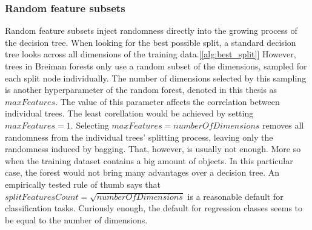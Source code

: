 \documentclass[11pt]{article}
\begin{document}
      \subsubsection{Random feature subsets}
        Random feature subsets inject randomness directly into the growing process of the decision tree. When looking for the best possible split, a standard decision tree looks across all dimensions of the training data.[\ref{alg:best_split}] However, trees in Breiman forests only use a random subset of the dimensions, sampled for each split node individually. The number of dimensions selected by this sampling is another hyperparameter of the random forest, denoted in this thesis as $maxFeatures$. The value of this parameter affects the correlation between individual trees.\cite{brabec} The least corellation would be achieved by setting $maxFeatures = 1$. Selecting $maxFeatures = numberOfDimensions$ removes all randomness from the individual trees' splitting process, leaving only the randomness induced by bagging. That, however, is usually not enough. More so when the training dataset contains a big amount of objects. In this particular case, the forest would not bring many advantages over a decision tree. An empirically tested rule of thumb says that $splitFeaturesCount = \sqrt{numberOfDimensions}$ is a reasonable default for classification tasks.\cite{ert} Curiously enough, the default for regression classes seems to be equal to the number of dimensions.\cite{ert}
  \newpage
\end{document}
